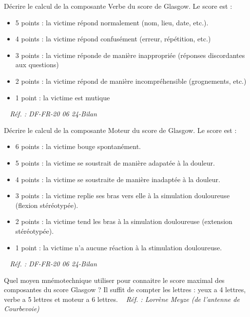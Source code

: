 \documentclass[grid,avery5371,landscape]{flashcards}
\makeatletter
\newcounter{nocarte}
\newcommand{\categ}[1]{%
  \def\@categ{#1}%
  \setcounter{nocarte}{0}%
}
\newcommand{\source}[1]{%
  \medskip
  \itshape%
   ~ \hfill Réf. : #1}
\makeatother
\begin{document}
\color[HTML]{003273}
\categ{PSE}
\begin{flashcard}[bilan]{
 Décrire le calcul de la composante Verbe du score de Glasgow.   }
  Le score est :
\begin{itemize} 
\item 5 points : la victime répond normalement (nom, lieu, date, etc.).
\item 4 points : la victime répond confusément (erreur, répétition, etc.)
\item 3 points : la victime réponde de manière inappropriée (réponses discordantes aux questions)
\item 2 points : la victime répond de manière incompréhensible (grognements, etc.)
\item 1 point : la victime est mutique
\end{itemize}
  \source{DF-FR-20 06 24-Bilan}
\end{flashcard}


\color[HTML]{003273}
\categ{PSE}
\begin{flashcard}[bilan]{
 Décrire le calcul de la composante Moteur du score de Glasgow.   }
  Le score est :
\begin{itemize} 
\item 6 points : la victime bouge spontanément.
\item 5 points : la victime se soustrait de manière adapatée à la douleur.
\item 4 points : la victime se soustraite de manière inadaptée à la douleur.
\item 3 points : la victime replie ses bras vers elle à la simulation douloureuse (flexion stéréotypée).
\item 2 points : la victime tend les bras à la simulation douloureuse (extension stéréotypée).
\item 1 point : la victime n'a aucune réaction à la stimulation douloureuse.
\end{itemize}
  \source{DF-FR-20 06 24-Bilan}
\end{flashcard}


\color[HTML]{003273}
\categ{PSE}
\begin{flashcard}[bilan]{
 Quel moyen mnémotechnique utiliser pour connaitre le score maximal des composantes du score Glasgow ?   }
  Il suffit de compter les lettres : yeux a 4 lettres, verbe a 5 lettres et moteur a 6 lettres.
  \source{Lorrène Meyze (de l'antenne de Courbevoie)}
\end{flashcard}
\end{document}
